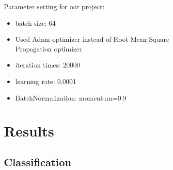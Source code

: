 \documentclass[conference]{IEEEtran}
\begin{document}
\begin{figure}[!h]
\begin{figure}[!h]
    Parameter setting for our project:

    \begin{itemize}
        \item batch size: 64
        \item Used Adam optimizer instead of Root Mean Square Propagation optimizer
        \item iteration times: 20000
        \item learning rate: 0.0001
        \item BatchNormalization: momentum=0.9
    \end{itemize}

    \section{Results}\label{sec:results}

    \subsection{Classification}\label{subsec:results-classification}
    

\end{figure}
\end{figure}
\end{document}
